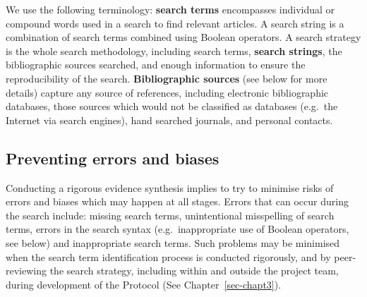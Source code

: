 \documentclass[
  letterpaper,
  DIV=11,
  numbers=noendperiod]{scrreprt}
\begin{document}
We use the following terminology: \textbf{search terms} encompasses
individual or compound words used in a search to find relevant articles.
A search string is a combination of search terms combined using Boolean
operators. A search strategy is the whole search methodology, including
search terms, \textbf{search strings}, the bibliographic sources
searched, and enough information to ensure the reproducibility of the
search. \textbf{Bibliographic sources} (see below for more details)
capture any source of references, including electronic bibliographic
databases, those sources which would not be classified as databases
(e.g.~the Internet via search engines), hand searched journals, and
personal contacts.

\subsection{Preventing errors and
biases}\label{preventing-errors-and-biases}

Conducting a rigorous evidence synthesis implies to try to minimise
risks of errors and biases which may happen at all stages. Errors that
can occur during the search include: missing search terms, unintentional
misspelling of search terms, errors in the search syntax
(e.g.~inappropriate use of Boolean operators, see below) and
inappropriate search terms. Such problems may be minimised when the
search term identification process is conducted rigorously, and by
peer-reviewing the search strategy, including within and outside the
project team, during development of the Protocol (See
Chapter~\ref{sec-chapt3}).
\end{document}
